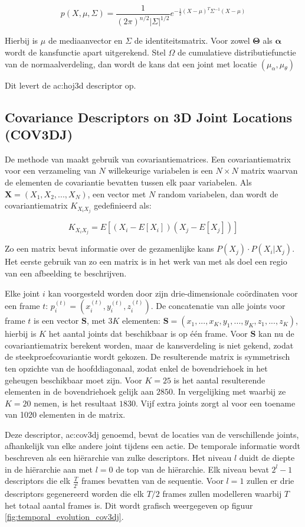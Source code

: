 $$p(X, \mu, \Sigma) = \frac{1}{(2\pi)^{n/2}|\Sigma|^{1/2}}e^{-\frac{1}{2}(X - \mu)^T\Sigma^{-1}(X - \mu)}$$

Hierbij is $\mu$ de mediaanvector en $\Sigma$ de identiteitsmatrix. Voor zowel $\mathbf{\Theta}$ als $\mathbf{\alpha}$ wordt de kansfunctie apart uitgerekend. Stel $\Omega$ de cumulatieve distributiefunctie van de normaalverdeling, dan wordt de kans dat een joint met locatie $(\mu_\alpha, \mu_\theta)$ 


Dit levert de \gls{ac:hoj3d} descriptor op.



\subsection{Covariance Descriptors on 3D Joint Locations (COV3DJ)}
De methode van \cite{Hussein2013} maakt gebruik van covariantiematrices. Een covariantiematrix voor een verzameling van $N$ willekeurige variabelen is een $N \times N$ matrix waarvan de elementen de covariantie bevatten tussen elk paar variabelen. Als $\textbf{X} = (X_1, X_2, ..., X_N)$, een vector met $N$ random variabelen, dan wordt de covariantiematrix $K_{X_{i}X_{j}}$ gedefinieerd als:

$$K_{X_{i}X_{j}} = E[(X_i - E[X_i])(X_j - E[X_j])]$$

Zo een matrix bevat informatie over de gezamenlijke kans $P(X_j) \cdot P(X_i | X_j)$. Het eerste gebruik van zo een matrix is in het werk van \cite{Tuzel2006} met als doel een regio van een afbeelding te beschrijven.

Elke joint $i$ kan voorgesteld worden door zijn drie-dimensionale coördinaten voor een frame $t$: $p_i^{(t)} = (x_i^{(t)}, y_i^{(t)}, z_i^{(t)})$. De concatenatie van alle joints voor frame $t$ is een vector $\textbf{S}$, met $3K$ elementen: $\textbf{S} = (x_1, ..., x_K,y_1, ..., y_K,z_1, ..., z_K)$, hierbij is $K$ het aantal joints dat beschikbaar is op één frame. Voor $\textbf{S}$ kan nu de covariantiematrix berekent worden, maar de kansverdeling is niet gekend, zodat de steekproefcovariantie wordt gekozen. De resulterende matrix is symmetrisch ten opzichte van de hoofddiagonaal, zodat enkel de bovendriehoek in het geheugen beschikbaar moet zijn. Voor $K = 25$ is het aantal resulterende elementen in de bovendriehoek gelijk aan $2850$. In vergelijking met \cite{Hussein2011} waarbij ze $K = 20$ nemen, is het resultaat $1830$. Vijf extra joints zorgt al voor een toename van 1020 elementen in de matrix.

Deze descriptor, \gls{ac:cov3dj} genoemd, bevat de locaties van de verschillende joints, afhankelijk van elke andere joint tijdens een actie. De temporale informatie wordt beschreven als een hiërarchie van zulke descriptors. Het niveau $l$ duidt de diepte in de hiërarchie aan met $l = 0$ de top van de hiërarchie. Elk niveau bevat $2^l - 1$ descriptors die elk $\frac{T}{2^l}$ frames bevatten van de sequentie. Voor $l = 1$ zullen er drie descriptors gegenereerd worden die elk $T/2$ frames zullen modelleren waarbij $T$ het totaal aantal frames is. Dit wordt grafisch weergegeven op figuur \ref{fig:temporal_evolution_cov3dj}.

